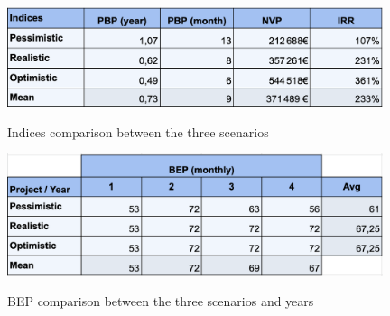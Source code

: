 \documentclass[./main.tex]{subfiles}
\begin{document}
\begin{table}[H]
	\centering
	\includegraphics[width=11cm]{img/indices2.png}
	\caption{Indices comparison between the three scenarios}
	\label{tab:indicies}
\end{table}
\begin{table}[H]
	\centering
	\includegraphics[width=11cm]{img/bep-year2.png}
	\caption{BEP comparison between the three scenarios and years}
	\label{tab:bep}
\end{table}
\end{document}
